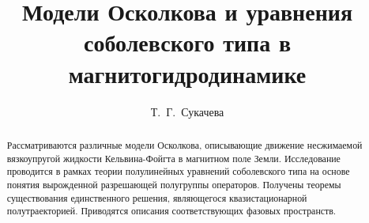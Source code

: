 

\usepackage[russian]{nla}

%
%


%




%
\fi

\title{Модели Осколкова и уравнения соболевского типа в магнитогидродинамике}
\author{Т.~Г.~Сукачева}  %




\maketitle

\begin{abstract}
Рассматриваются различные модели Осколкова, описывающие движение несжимаемой вязкоупругой жидкости Кельвина-Фойгта в магнитном поле Земли. Исследование проводится в рамках теории полулинейных уравнений соболевского типа на основе понятия вырожденной разрешающей полугруппы операторов. Получены теоремы существования единственного решения, являющегося квазистационарной полутраекторией. Приводятся описания соответствующих фазовых пространств.

\end{abstract}


